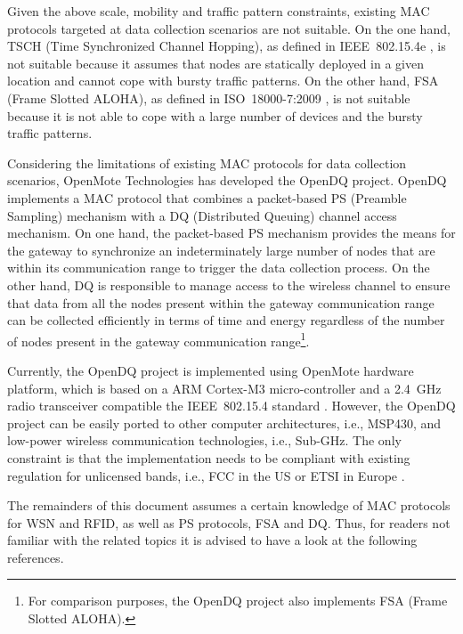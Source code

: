 Given the above scale, mobility and traffic pattern constraints, existing MAC protocols targeted at data collection scenarios are not suitable. On the one hand, TSCH (Time Synchronized Channel Hopping), as defined in IEEE~802.15.4e \cite{ieee802.15.4e}, is not suitable because it assumes that nodes are statically deployed in a given location and cannot cope with bursty traffic patterns. On the other hand, FSA (Frame Slotted ALOHA), as defined in ISO~18000-7:2009 \cite{iso18000-7:2009}, is not suitable because it is not able to cope with a large number of devices and the bursty traffic patterns.

Considering the limitations of existing MAC protocols for data collection scenarios, OpenMote Technologies has developed the OpenDQ project. OpenDQ implements a MAC protocol that combines a packet-based PS (Preamble Sampling) mechanism with a DQ (Distributed Queuing) channel access mechanism. On one hand, the packet-based PS mechanism provides the means for the gateway to synchronize an indeterminately large number of nodes that are within its communication range to trigger the data collection process. On the other hand, DQ is responsible to manage access to the wireless channel to ensure that data from all the nodes present within the gateway communication range can be collected efficiently in terms of time and energy regardless of the number of nodes present in the gateway communication range\footnote{For comparison purposes, the OpenDQ project also implements FSA (Frame Slotted ALOHA).}.

Currently, the OpenDQ project is implemented using OpenMote hardware platform, which is based on a ARM Cortex-M3 micro-controller and a 2.4~GHz radio transceiver compatible the IEEE~802.15.4 standard \cite{ieee802.15.4-2006}. However, the OpenDQ project can be easily ported to other computer architectures, i.e., MSP430, and low-power wireless communication technologies, i.e., Sub-GHz. The only constraint is that the implementation needs to be compliant with existing regulation for unlicensed bands, i.e., FCC in the US \cite{fcc} or ETSI in Europe \cite{etsi}.

The remainders of this document assumes a certain knowledge of MAC protocols for WSN and RFID, as well as PS protocols, FSA and DQ. Thus, for readers not familiar with the related topics it is advised to have a look at the following references.

